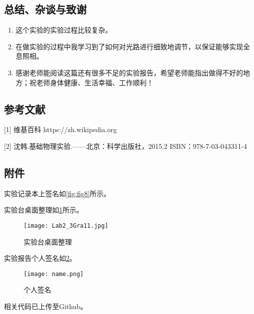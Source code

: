 \documentclass[dvipsnames, svgnames,a4paper,11pt]{article}
\begin{document}
	\subsection{总结、杂谈与致谢}
	\begin{enumerate}
		\item 这个实验的实验过程比较复杂。
		\item 在做实验的过程中我学习到了如何对光路进行细致地调节，以保证能够实现全息照相。
		\item 感谢老师能阅读这篇还有很多不足的实验报告，希望老师能指出做得不好的地方；祝老师身体健康、生活幸福、工作顺利！
	\end{enumerate}
	
	\subsection{参考文献}
	[1] 维基百科 https://zh.wikipedia.org
	
	[2] 沈韩.基础物理实验.——北京：科学出版社，2015.2 ISBN：978-7-03-043311-4
	
	
	\subsection{附件}
	实验记录本上签名如\cref{fig:fig8}所示。
	
	实验台桌面整理如\cref{fig:fig11}所示。
	
	\begin{figure}[htbp]
		\centering
		\texttt{[image: Lab2\_3Gra11.jpg]}
		\caption{实验台桌面整理}
		\label{fig:fig11}
	\end{figure}
	
	实验报告个人签名如\cref{fig:name}。
	
	\begin{figure}[htbp]
		\centering
		\texttt{[image: name.png]}
		\caption{个人签名}
		\label{fig:name}
	\end{figure}
	
	
	相关代码已上传至Github。
	
	
	
\end{document}

